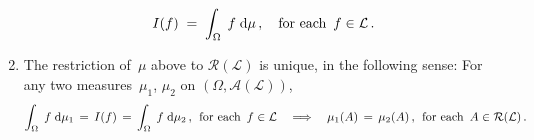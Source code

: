 \begin{theorem}
\begin{enumerate}
	\begin{equation*}
	I(f) \; = \; \int_{\Omega}\; f \;\textnormal{d}\mu\,,
	\quad\textnormal{for each \,$f \in \mathcal{L}$}\,.
	\end{equation*}
\item
	The restriction of \,$\mu$ above to $\mathcal{R}(\mathcal{L})$ is unique, in the following sense:\;
	For any two measures \,$\mu_{1}$, $\mu_{2}$ on $(\Omega,\mathcal{A}(\mathcal{L}))$,
	\begin{equation*}
		\int_{\Omega}\; f \;\textnormal{d}\mu_{1} \, = \, I(f) \, = \, \int_{\Omega}\; f \;\textnormal{d}\mu_{2}\,,
		\;\,\textnormal{for each \,$f \in \mathcal{L}$}
	\quad\Longrightarrow\quad
		\mu_{1}(A) \,=\, \mu_{2}(A)\,,
		\;\,\textnormal{for each \,$A \in \mathcal{R(\mathcal{L})}$}\,.
	\end{equation*}	
\end{enumerate} 
\end{theorem}


